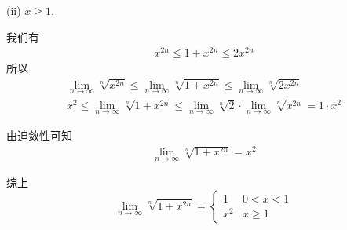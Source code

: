 \documentclass{article}
\begin{document}
(ii) $x \geq 1$.

我们有
\begin{align*}
  x^{2n} \leq 1 + x^{2n} \leq 2x^{2n}
\end{align*}
所以
\begin{align*}
  \lim\limits_{n \to \infty} \sqrt[n]{x^{2n}} \leq \lim\limits_{n \to \infty} \sqrt[n]{1 + x^{2n}} \leq \lim\limits_{n \to \infty} \sqrt[n]{2x^{2n}} \\
  x^2 \leq \lim\limits_{n \to \infty} \sqrt[n]{1 + x^{2n}} \leq \lim\limits_{n \to \infty} \sqrt[n]{2} \cdot \lim\limits_{n \to \infty} \sqrt[n]{x^{2n}} = 1 \cdot x^2
\end{align*}

由迫敛性可知
\begin{align*}
  \lim\limits_{n \to \infty} \sqrt[n]{1 + x^{2n}} = x^2
\end{align*}

综上
\begin{equation*}
  \lim\limits_{n \to \infty} \sqrt[n]{1 + x^{2n}} =
  \begin{cases}
    1   & 0 < x < 1 \\
    x^2 & x \geq 1
  \end{cases}
\end{equation*}
\end{document}
